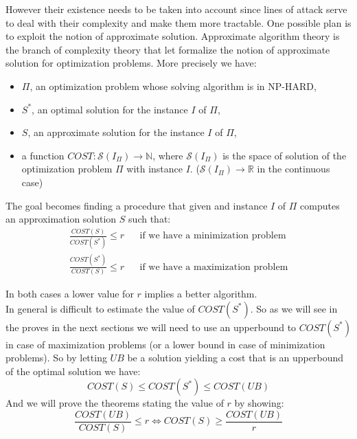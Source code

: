 However their existence needs to be taken into account since lines of attack serve to deal with their complexity and make them more tractable.
One possible plan is to exploit the notion of approximate solution.
Approximate algorithm theory is the branch of complexity theory that let formalize the notion of approximate solution for optimization problems.
More precisely we have:
\begin{itemize}
	\item $ \Pi $, an optimization problem whose solving algorithm is in NP-HARD,
	\item $ S^{*} $, an optimal solution for the instance $ I $ of $ \Pi $,
	\item $ S $, an approximate solution for the instance $ I $ of $ \Pi $,
	\item a function $ COST: \mathcal{S}(I_{\Pi}) \rightarrow \mathbb{N} $, where $ \mathcal{S}(I_{\Pi})$ is the space of solution of the optimization problem $ \Pi $ with instance $ I $. ($ \mathcal{S}(I_{\Pi}) \rightarrow \mathbb{R} $ in the continuous case)
\end{itemize}
The goal becomes finding a procedure that given and instance $ I $ of $ \Pi $ computes an approximation solution $ S $ such that:
\begin{align*}
	\frac{COST(S)}{COST(S^*)} \leq r && \text{if we have a minimization problem} \\
	\frac{COST(S^*)}{COST(S)} \leq r && \text{if we have a maximization problem}
\end{align*}

In both cases a lower value for $ r $ implies a better algorithm.\\
In general is difficult to estimate the value of $ COST(S^{*}) $. So as we will see in the proves in the next sections we will need to use an upperbound to $ COST(S^{*}) $ in case of 
maximization problems (or a lower bound in case of minimization problems). 
So by letting $ UB $ be a solution yielding a cost that is an upperbound of the optimal solution we have:
\[ COST(S) \leq COST(S^{*}) \leq COST(UB) \]
And we will prove the theorems stating the value of $ r $ by showing:
\[ 
\frac{COST(UB)}{COST(S)} \leq r 
\Longleftrightarrow
COST(S) \geq \frac{COST(UB)}{r} \]